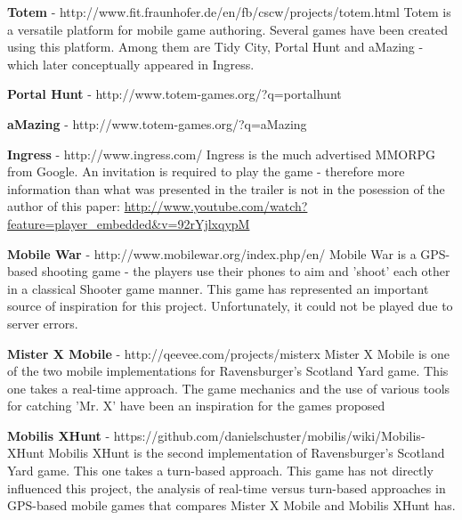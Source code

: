 \textbf{Totem} - http://www.fit.fraunhofer.de/en/fb/cscw/projects/totem.html
\newline
Totem is a versatile platform for mobile game authoring. Several games have been
created using this platform. Among them are Tidy City, Portal Hunt and aMazing -
which later conceptually appeared in Ingress.\newline

\textbf{Portal Hunt} - http://www.totem-games.org/?q=portalhunt \newline

\textbf{aMazing} - http://www.totem-games.org/?q=aMazing \newline

\textbf{Ingress} - http://www.ingress.com/ \newline
Ingress is the much advertised MMORPG from Google. An invitation is required to
play the game - therefore more information than what was presented in the
trailer is not in the posession of the author of this paper:\newline
\url{http://www.youtube.com/watch?feature=player_embedded&v=92rYjlxqypM}\newline

\textbf{Mobile War} - http://www.mobilewar.org/index.php/en/ \newline
Mobile War is a GPS-based shooting game - the players use their phones to aim
and 'shoot' each other in a classical Shooter game manner. This game has
represented an important source of inspiration for this project.
Unfortunately, it could not be played due to server errors.\newline

\textbf{Mister X Mobile} - http://qeevee.com/projects/misterx \newline
Mister X Mobile is one of the two mobile implementations for Ravensburger's
Scotland Yard game. This one takes a real-time approach. The game mechanics and
the use of various tools for catching 'Mr. X' have been an inspiration for the
games proposed\newline

\textbf{Mobilis XHunt} - https://github.com/danielschuster/mobilis/wiki/Mobilis-XHunt
\newline
Mobilis XHunt is the second implementation of Ravensburger's Scotland Yard game.
This one takes a turn-based approach. This game has not directly influenced this
project, the analysis\cite{rttvsrts2} of real-time versus turn-based approaches in
GPS-based mobile games that compares Mister X Mobile and Mobilis XHunt has.\newline

